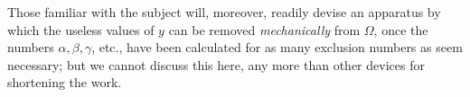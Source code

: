 Those familiar with the subject will, moreover, readily devise an apparatus by which the useless values of \(y\) can be removed \textit{mechanically} from \(\Omega\), once the numbers \(\alpha,\allowbreak \beta,\allowbreak \gamma\), etc., have been calculated for as many exclusion numbers as seem necessary; but we cannot discuss this here, any more than other devices for shortening the work.
